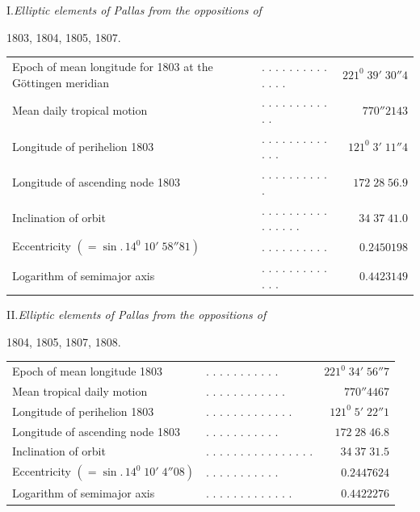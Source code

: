 \begin{center}I.\quad\textit{Elliptic elements of Pallas from the oppositions of}\par
1803, 1804, 1805, 1807.\end{center}
\begingroup\small\setlength{\tabcolsep}{2pt}
\noindent\begin{tabular}{@{}p{.51\linewidth}lr@{}}
Epoch of mean longitude for 1803 at the Göttingen meridian&. . . . . . . . . . . . . .&$221^0\;39'\;30''4$\\
Mean daily tropical motion&. . . . . . . . . . . .&$770''2143$\\
Longitude of perihelion 1803&. . . . . . . . . . . . .&$121^0\;3'\;11''4$\\
Longitude of ascending node 1803&. . . . . . . . . . .&$172\;28\;56.9$\\
Inclination of orbit&. . . . . . . . . . . . . . . .&$34\;37\;41.0$\\
Eccentricity $(=\sin.\,14^0\;10'\;58''81)$&. . . . . . . . . .&$0.2450198$\\
Logarithm of semimajor axis&. . . . . . . . . . . . .&$0.4423149$
\end{tabular}\par\endgroup

\begin{center}II.\quad\textit{Elliptic elements of Pallas from the oppositions of}\par
1804, 1805, 1807, 1808.\end{center}
\begingroup\small\setlength{\tabcolsep}{2pt}
\noindent\begin{tabular}{@{}p{.51\linewidth}lr@{}}
Epoch of mean longitude 1803&. . . . . . . . . . .&$221^0\;34'\;56''7$\\
Mean tropical daily motion&. . . . . . . . . . . .&$770''4467$\\
Longitude of perihelion 1803&. . . . . . . . . . . . .&$121^0\;5'\;22''1$\\
Longitude of ascending node 1803&. . . . . . . . . . .&$172\;28\;46.8$\\
Inclination of orbit&. . . . . . . . . . . . . . . .&$34\;37\;31.5$\\
Eccentricity $(=\sin.\,14^0\;10'\;4''08)$&. . . . . . . . . . .&$0.2447624$\\
Logarithm of semimajor axis&. . . . . . . . . . . . .&$0.4422276$
\end{tabular}\par\endgroup

